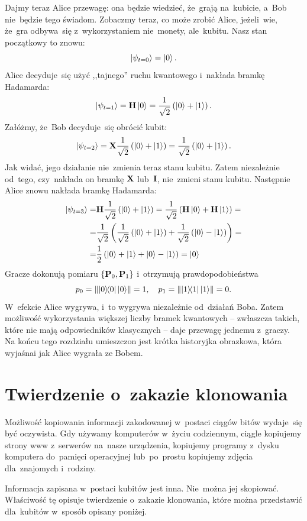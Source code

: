 Dajmy teraz Alice przewagę: ona będzie wiedzieć, że~grają na~kubicie, a~Bob nie~będzie tego świadom.
Zobaczmy teraz, co może zrobić Alice, jeżeli~wie, że~gra odbywa~się z~wykorzystaniem nie~monety, ale~kubitu.
Nasz stan początkowy to znowu:
$$
	\ket{\psi_{t=0}}=\ket{0}.
$$
Alice decyduje~się użyć ,,tajnego'' ruchu kwantowego i~nakłada bramkę Hadamarda:
$$
	\ket{\psi_{t=1}}=\mathbf{H}\ket{0}=\frac{1}{\sqrt{2}}\left(\ket{0}+\ket{1}\right).
$$
Załóżmy, że~Bob decyduje~się obrócić kubit:
$$
	\ket{\psi_{t=2}}=\mathbf{X}\frac{1}{\sqrt{2}}\left(\ket{0}+\ket{1}\right)=\frac{1}{\sqrt{2}}\left(\ket{0}+\ket{1}\right).
$$
Jak widać, jego działanie nie~zmienia teraz stanu kubitu. Zatem niezależnie od~tego, czy~nakłada on bramkę $\mathbf{X}$ lub~$\mathbf{I}$, nie~zmieni stanu kubitu.
Następnie Alice znowu nakłada bramkę Hadamarda:
\begin{equation*}
	\begin{split}
		\ket{\psi_{t=3}}=&\mathbf{H}\frac{1}{\sqrt{2}}\left(\ket{0}+\ket{1}\right)=
		\frac{1}{\sqrt{2}}\left(\mathbf{H}\ket{0}+\mathbf{H}\ket{1}\right)=\\
		=&\frac{1}{\sqrt{2}}\left(\frac{1}{\sqrt{2}}\left(\ket{0}+\ket{1}\right)+
		\frac{1}{\sqrt{2}}\left(\ket{0}-\ket{1}\right)\right)=\\
		=&\frac{1}{2}\left(\ket{0}+\ket{1}+\ket{0}-\ket{1}\right)=
		\ket{0}
	\end{split}
\end{equation*}
Gracze dokonują pomiaru $\{\mathbf{P}_0,\mathbf{P}_1\}$ i~otrzymują prawdopodobieństwa
$$
	p_0=\norm{\ketbra{0}{0}\ket{0}}=1, \quad p_1=\norm{\ketbra{1}{1}\ket{1}}=0.
$$
W~efekcie Alice wygrywa, i~to wygrywa niezależnie od~działań Boba.
Zatem możliwość wykorzystania większej liczby bramek kwantowych -- zwłaszcza takich,
które nie mają odpowiedników klasycznych -- daje przewagę jednemu z~graczy.
Na końcu tego rozdziału umieszczon jest krótka
historyjka obrazkowa, która wyjaśnai jak Alice wygrała ze Bobem.

\section{Twierdzenie o~zakazie klonowania}
Możliwość kopiowania informacji zakodowanej w~postaci ciągów bitów wydaje~się być oczywista.
Gdy używamy komputerów w~życiu codziennym, ciągle kopiujemy strony www z~serwerów na~nasze urządzenia,
kopiujemy programy z~dysku komputera do~pamięci operacyjnej lub~po~prostu kopiujemy zdjęcia dla~znajomych i~rodziny.

Informacja zapisana w~postaci kubitów jest inna. Nie~można jej skopiować. Właściwość tę opisuje
twierdzenie o~zakazie klonowania, które można przedstawić dla~kubitów w~sposób opisany poniżej.

